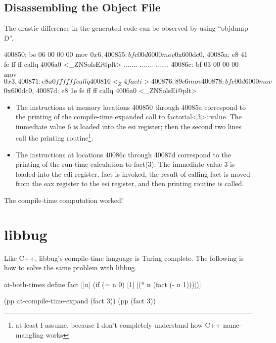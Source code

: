 \subsection{Disassembling the Object File}
 The drastic difference in the generated code can be observed by using ``objdump -D''.

 \begin{code}
 400850: be 06 00 00 00   mov    $0x6,%
 400855: bf c0 0d 60 00   mov    $0x600dc0,%
 40085a: e8 41 fe ff ff   callq  4006a0 <_ZNSolsEi@plt>
 .......
 .......
 .......
 40086c: bf 03 00 00 00   mov    $0x3,%
 400871: e8 a0 ff ff ff   callq  400816 <_Z4facti>
 400876: 89 c6            mov    %
 400878: bf c0 0d 60 00   mov    $0x600dc0,%
 40087d: e8 1e fe ff ff   callq  4006a0 <_ZNSolsEi@plt>
 \end{code}

 \begin{itemize}
   \item
 The instructions at memory locations 400850 through 40085a correspond to the
 printing of the compile-time expanded call to factorial\textless3\textgreater::value.
 The immediate value 6 is loaded into the esi register; then the second
 two lines call the printing routine\footnote{at least I assume, because
 I don't completely understand how C++ name-mangling works}.
   \item
 The instructions at locations 40086c through 40087d correspond to the
 printing of the run-time calculation to fact(3).  The immediate value 3
 is loaded into the edi register, fact is invoked, the result of
 calling fact is moved from the eax register to the esi register, and then
 printing routine is called.

 \end{itemize}
 The compile-time computation worked!

 \section{libbug}
 Like C++, libbug's compile-time language is Turing complete.
 The following is how to solve the same problem with libbug.

 \begin{code}
 {at-both-times
  {define fact
    [|n| (if (= n 0)
             [1]
             [(* n (fact (- n 1)))])]}}

 (pp {at-compile-time-expand (fact 3)})
 (pp (fact 3))
 \end{code}

